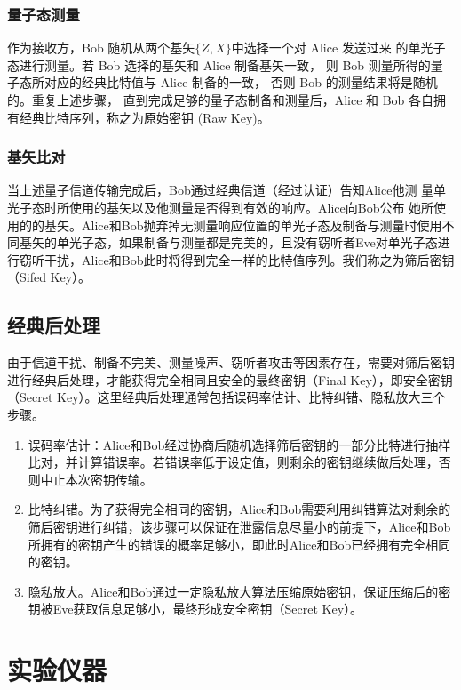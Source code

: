 \documentclass[a4paper,UTF8]{ctexart}
\begin{document}
\subsubsection{量子态测量}

作为接收方，Bob 随机从两个基矢$\{Z,X\}$中选择一个对 Alice 发送过来
的单光子态进行测量。若 Bob 选择的基矢和 Alice 制备基矢一致，
则 Bob 测量所得的量子态所对应的经典比特值与 Alice 制备的一致，
否则 Bob 的测量结果将是随机的。重复上述步骤，
直到完成足够的量子态制备和测量后，Alice 和 Bob 各自拥
 有经典比特序列，称之为原始密钥 (Raw Key)。

\subsubsection{基矢比对}

当上述量子信道传输完成后，Bob通过经典信道（经过认证）告知Alice他测
量单光子态时所使用的基矢以及他测量是否得到有效的响应。Alice向Bob公布
她所使用的的基矢。Alice和Bob抛弃掉无测量响应位置的单光子态及制备与测量时使用不同基矢的单光子态，如果制备与测量都是完美的，且没有窃听者Eve对单光子态进行窃听干扰，Alice和Bob此时将得到完全一样的比特值序列。我们称之为筛后密钥（Sifed Key）。

\subsection{经典后处理}

由于信道干扰、制备不完美、测量噪声、窃听者攻击等因素存在，需要对筛后密钥进行经典后处理，才能获得完全相同且安全的最终密钥（Final Key），即安全密钥（Secret Key）。这里经典后处理通常包括误码率估计、比特纠错、隐私放大三个步骤。

\begin{enumerate}
    \item 误码率估计：Alice和Bob经过协商后随机选择筛后密钥的一部分比特进行抽样比对，并计算错误率。若错误率低于设定值，则剩余的密钥继续做后处理，否则中止本次密钥传输。
    \item 比特纠错。为了获得完全相同的密钥，Alice和Bob需要利用纠错算法对剩余的筛后密钥进行纠错，该步骤可以保证在泄露信息尽量小的前提下，Alice和Bob所拥有的密钥产生的错误的概率足够小，即此时Alice和Bob已经拥有完全相同的密钥。
    \item 隐私放大。Alice和Bob通过一定隐私放大算法压缩原始密钥，保证压缩后的密钥被Eve获取信息足够小，最终形成安全密钥（Secret Key）。
\end{enumerate}

\section{实验仪器}
\end{document}
